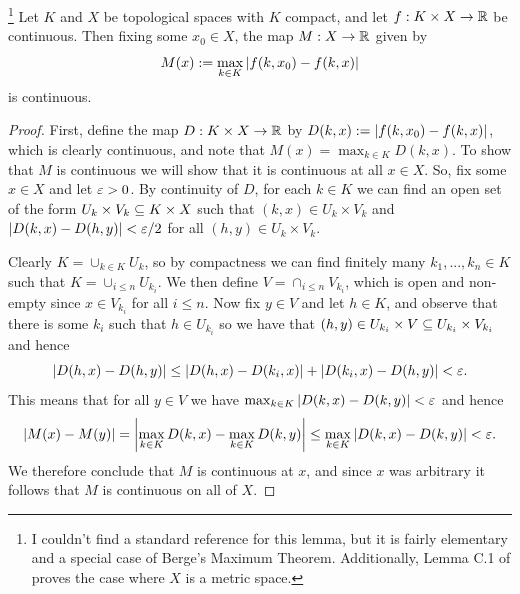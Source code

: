 \begin{lemma}\label{lem:max-cpt-cont}
    \footnote{I couldn't find a standard reference for this lemma, but it is fairly elementary and a special case of Berge's Maximum Theorem.
    Additionally, Lemma C.1 of \cite{dai2026maximalstretchlipschitzmaps} proves the case where $X$ is a metric space.
    }
    Let $K$ and $X$ be topological spaces with $K$ compact, and let $f : K \times X \to \mathbb{R}$ be continuous.
    Then fixing some $x_0 \in X$, the map $M : X \to \mathbb{R}$ given by
    \[
        M(x) := \max_{k \in K} \left| f(k,x_0) - f(k,x) \right|
    \]
    is continuous.
    \begin{proof}
        First, define the map $D : K \times X \to \mathbb{R}$ by $D(k,x) := \left| f(k,x_0) - f(k,x) \right|$, which is clearly continuous, and note that $M(x) = \max_{k \in K} D(k,x)$.
        To show that $M$ is continuous we will show that it is continuous at all $x \in X$.
        So, fix some $x \in X$ and let $\varepsilon > 0$.
        By continuity of $D$, for each $k \in K$ we can find an open set of the form $U_k \times V_k \subseteq K \times X$ such that $(k,x) \in U_k \times V_k$ and $\left| D(k,x) - D(h,y) \right| < \varepsilon/2$ for all $(h,y) \in U_k \times V_k$.

        Clearly $K = \cup_{k \in K} U_k$, so by compactness we can find finitely many $k_1,...,k_n \in K$ such that $K = \cup_{i \leq n} U_{k_i}$.
        We then define $V = \cap_{i \leq n} V_{k_i}$, which is open and non-empty since $x \in V_{k_i}$ for all $i \leq n$.
        Now fix $y \in V$ and let $h \in K$, and observe that there is some $k_i$ such that $h \in U_{k_i}$ so we have that $(h,y) \in U_{k_i} \times V \subseteq U_{k_i} \times V_{k_i}$ and hence
        \[
            \left| D(h,x) - D(h,y) \right|
            \leq \left| D(h,x) - D(k_i,x) \right| + \left| D(k_i,x) - D(h,y) \right|
            < \varepsilon.
        \]
        This means that for all $y \in V$ we have $\max_{k \in K} \left| D(k,x) - D(k,y) \right| < \varepsilon$ and hence
        \[
            \left| M(x) - M(y) \right|
            = \left| \max_{k \in K} D(k,x) - \max_{k \in K} D(k,y) \right|
            \leq \max_{k \in K} \left| D(k,x) -  D(k,y) \right|
            < \varepsilon.
        \]
        We therefore conclude that $M$ is continuous at $x$, and since $x$ was arbitrary it follows that $M$ is continuous on all of $X$.
    \end{proof}
\end{lemma}


